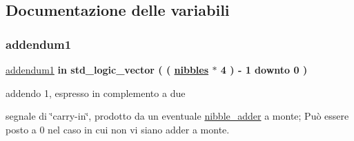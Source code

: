 \subsection{Documentazione delle variabili}
\mbox{\label{group___carry_loockahead_gae4a2e124144a2f35270a55f0cf32a5ee}} 
\subsubsection{\texorpdfstring{addendum1}{addendum1}}
{\footnotesize\ttfamily \hyperlink{group___carry_loockahead_gae4a2e124144a2f35270a55f0cf32a5ee}{addendum1} {\bfseries \textcolor{vhdlchar}{in}\textcolor{vhdlchar}{ }} {\bfseries \textcolor{vhdlchar}{std\+\_\+logic\+\_\+vector}\textcolor{vhdlchar}{ }\textcolor{vhdlchar}{(}\textcolor{vhdlchar}{ }\textcolor{vhdlchar}{(}\textcolor{vhdlchar}{ }\textcolor{vhdlchar}{ }\textcolor{vhdlchar}{ }\textcolor{vhdlchar}{ }{\bfseries \hyperlink{group___carry_loockahead_ga0b63b586531492d0fa882246cca071c1}{nibbles}} \textcolor{vhdlchar}{$\ast$}\textcolor{vhdlchar}{ } \textcolor{vhdldigit}{4} \textcolor{vhdlchar}{ }\textcolor{vhdlchar}{)}\textcolor{vhdlchar}{ }\textcolor{vhdlchar}{-\/}\textcolor{vhdlchar}{ } \textcolor{vhdldigit}{1} \textcolor{vhdlchar}{ }\textcolor{vhdlchar}{downto}\textcolor{vhdlchar}{ }\textcolor{vhdlchar}{ } \textcolor{vhdldigit}{0} \textcolor{vhdlchar}{ }\textcolor{vhdlchar}{)}\textcolor{vhdlchar}{ }} \hspace{0.3cm}{\ttfamily [Port]}}



addendo 1, espresso in complemento a due 

segnale di \char`\"{}carry-\/in\char`\"{}, prodotto da un eventuale \hyperlink{classnibble__adder}{nibble\+\_\+adder} a monte; Può essere posto a \textquotesingle{}0\textquotesingle{} nel caso in cui non vi siano adder a monte. \mbox{\label{group___carry_loockahead_ga2715463c615cf8418f85c6a1427ce62c}} 
